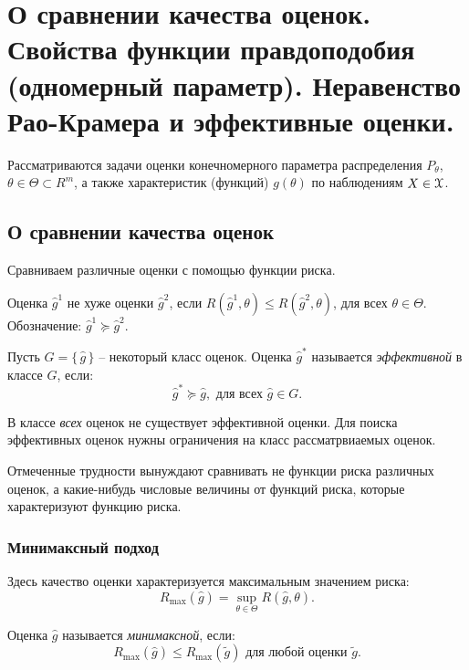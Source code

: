 \section{О сравнении качества оценок. Свойства функции правдоподобия (одномерный параметр). Неравенство Рао-Крамера и эффективные оценки.}

Рассматриваются задачи оценки конечномерного параметра распределения $P_{\theta}$, $\theta \in \Theta \subset R^m$, а также характеристик (функций) $g(\theta)$ по наблюдениям $X \in \mathcal{X}$.

\subsection{О сравнении качества оценок}
Сравниваем различные оценки с помощью функции риска. 
\begin{definition}
	Оценка $\hat{g}^{1}$ не хуже оценки $\hat{g}^{2}$, если $R(\hat{g}^{1}, \theta) \leq R(\hat{g}^{2}, \theta)$, для всех $\theta \in \Theta$. Обозначение: $\hat{g}^{1} \succeq \hat{g}^{2}$.
\end{definition}

\begin{definition}
	Пусть $G = \{\,\hat{g}\,\}$ -- некоторый класс оценок. Оценка $\hat{g}^{*}$ называется \textit{эффективной} в классе $G$, если:
	\[
        \hat{g}^{*} \succeq \hat{g}, \text{ для всех } \hat{g} \in G
	.\]
\end{definition}

В классе \textit{всех} оценок не существует эффективной оценки. Для поиска эффективных оценок нужны ограничения на класс рассматрвиаемых оценок. 

Отмеченные трудности вынуждают сравнивать не функции риска различных оценок, а какие-нибудь числовые величины от функций риска, которые характеризуют функцию риска. 

\subsubsection{Минимаксный подход}
Здесь качество оценки характеризуется максимальным значением риска:
\[
    R_{\max}(\hat{g}) = \sup_{\theta \in \Theta} R(\hat{g}, \theta)
.\]

\begin{definition}
	Оценка $\hat{g}$ называется \textit{минимаксной}, если:
	\[
        R_{\max}(\hat{g}) \leqslant R_{\max}(\tilde{g}) \text{ для любой оценки } \tilde{g}
	.\]
\end{definition}

